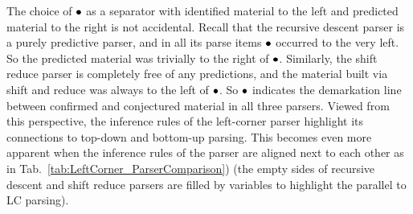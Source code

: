 The choice of $\bullet$ as a separator with identified material to the left and predicted material to the right is not accidental.
Recall that the recursive descent parser is a purely predictive parser, and in all its parse items $\bullet$ occurred to the very left.
So the predicted material was trivially to the right of $\bullet$.
Similarly, the shift reduce parser is completely free of any predictions, and the material built via shift and reduce was always to the left of $\bullet$.
So $\bullet$ indicates the demarkation line between confirmed and conjectured material in all three parsers.
Viewed from this perspective, the inference rules of the left-corner parser highlight its connections to top-down and bottom-up parsing.
This becomes even more apparent when the inference rules of the parser are aligned next to each other as in Tab.~\ref{tab:LeftCorner_ParserComparison}) (the empty sides of recursive descent and shift reduce parsers are filled by variables to highlight the parallel to LC parsing).
%
